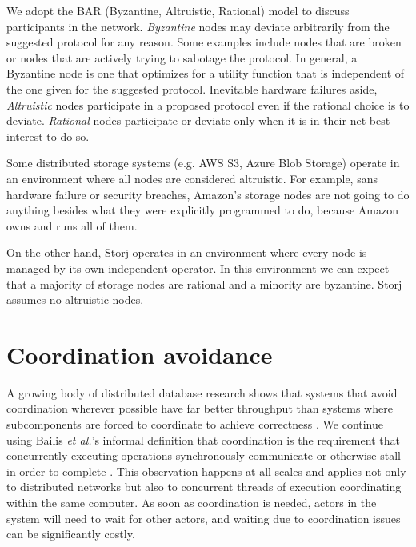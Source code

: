 \documentclass[11pt,fleqn,openany]{book}
\begin{document}
We adopt the BAR (Byzantine, Altruistic, Rational) model \cite{bar} to discuss
participants in the network.
{\em Byzantine} nodes may deviate arbitrarily from the suggested protocol for
any reason. Some examples include nodes that are broken or nodes that
are actively trying to sabotage the protocol. In general, a Byzantine node is
one that optimizes for a utility function that is independent of the one
given for the suggested protocol.
Inevitable hardware failures aside, {\em Altruistic} nodes
participate in a proposed protocol even if the rational choice is to deviate.
{\em Rational} nodes participate or deviate only when it
is in their net best interest to do so.

Some distributed storage systems (e.g. AWS S3, Azure Blob Storage)
operate in an environment
where all nodes are considered altruistic. For example, sans hardware failure
or security breaches, Amazon's storage nodes
are not going to do anything besides what they were explicitly programmed to do,
because Amazon owns and runs all of them.

On the other hand, Storj operates in an environment where every node is
managed by its own independent operator.
In this environment we can expect that a majority
of storage nodes are rational and a minority are byzantine. Storj assumes no
altruistic nodes.

\section{Coordination avoidance}\label{sec:coordination-avoidance}

A growing body of distributed database research shows that systems that
avoid coordination wherever possible have far better throughput than systems
where subcomponents are forced to coordinate to achieve correctness
\cite{cap1, cap2, consistency-vs-latency, hat, i-confluence, anna,
calm1, calm2}.
We continue using Bailis {\em et al.}'s informal definition
that coordination is the requirement that concurrently executing operations
synchronously communicate or otherwise stall in order to complete
\cite{i-confluence}.
This observation happens at all scales and applies not only to distributed
networks but also to
concurrent threads of execution coordinating within the same computer.
As soon as coordination is needed, actors in the system will need to wait for
other actors, and waiting due to coordination issues can be significantly
costly.
\end{document}
